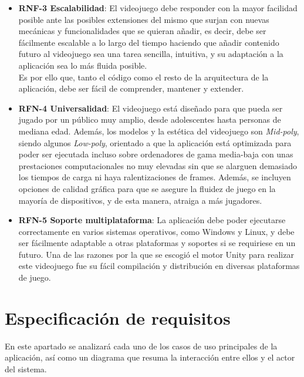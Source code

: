 \begin{itemize}
    \item \textbf{RNF-3 Escalabilidad}: El videojuego debe responder con la mayor facilidad posible ante las posibles extensiones del mismo que surjan con nuevas mecánicas y funcionalidades que se quieran añadir, es decir, debe ser fácilmente escalable a lo largo del tiempo haciendo que añadir contenido futuro al videojuego sea una tarea sencilla, intuitiva, y su adaptación a la aplicación sea lo más fluida posible.\\
    Es por ello que, tanto el código como el resto de la arquitectura de la aplicación, debe ser fácil de comprender, mantener y extender.
    \item \textbf{RFN-4 Universalidad}: El videojuego está diseñado para que pueda ser jugado por un público muy amplio, desde adolescentes hasta personas de mediana edad. Además, los modelos y la estética del videojuego son \textit{Mid-poly}, siendo algunos \textit{Low-poly}, orientado a que la aplicación está optimizada para poder ser ejecutada incluso sobre ordenadores de gama media-baja con unas prestaciones computacionales no muy elevadas sin que se alarguen demasiado los tiempos de carga ni haya ralentizaciones de frames. Además, se incluyen opciones de calidad gráfica para que se asegure la fluidez de juego en la mayoría de dispositivos, y de esta manera, atraiga a más jugadores.
    \item \textbf{RFN-5 Soporte multiplataforma}: La aplicación debe poder ejecutarse correctamente en varios sistemas operativos, como Windows y Linux, y debe ser fácilmente adaptable a otras plataformas y soportes si se requiriese en un futuro. Una de las razones por la que se escogió el motor Unity para realizar este videojuego fue su fácil compilación y distribución en diversas plataformas de juego.
\end{itemize}

\section{Especificación de requisitos}
En este apartado se analizará cada uno de los casos de uso principales de la aplicación, así como un diagrama que resuma la interacción entre ellos y el actor del sistema.

